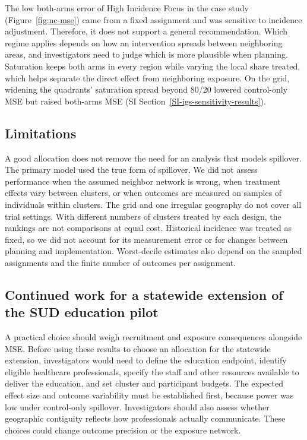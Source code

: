 \documentclass[Afour,sagev,times]{sagej}
\begin{document}
The low both-arms error of High Incidence Focus in the case study (Figure~\ref{fig:nc-mse}) came from a fixed assignment and was sensitive to incidence adjustment. Therefore, it does not support a general recommendation. Which regime applies depends on how an intervention spreads between neighboring areas, and investigators need to judge which is more plausible when planning. Saturation keeps both arms in every region while varying the local share treated, which helps separate the direct effect from neighboring exposure. On the grid, widening the quadrants' saturation spread beyond 80/20 lowered control-only MSE but raised both-arms MSE (SI Section~\ref{SI-igs-sensitivity-results}).

\subsection{Limitations}
A good allocation does not remove the need for an analysis that models spillover. The primary model used the true form of spillover. We did not assess performance when the assumed neighbor network is wrong, when treatment effects vary between clusters, or when outcomes are measured on samples of individuals within clusters. The grid and one irregular geography do not cover all trial settings. With different numbers of clusters treated by each design, the rankings are not comparisons at equal cost. Historical incidence was treated as fixed, so we did not account for its measurement error or for changes between planning and implementation. Worst-decile estimates also depend on the sampled assignments and the finite number of outcomes per assignment.

\subsection{Continued work for a statewide extension of the SUD education pilot}
A practical choice should weigh recruitment and exposure consequences alongside MSE. Before using these results to choose an allocation for the statewide extension, investigators would need to define the education endpoint, identify eligible healthcare professionals, specify the staff and other resources available to deliver the education, and set cluster and participant budgets. The expected effect size and outcome variability must be established first, because power was low under control-only spillover. Investigators should also assess whether geographic contiguity reflects how professionals actually communicate. These choices could change outcome precision or the exposure network.
\end{document}
